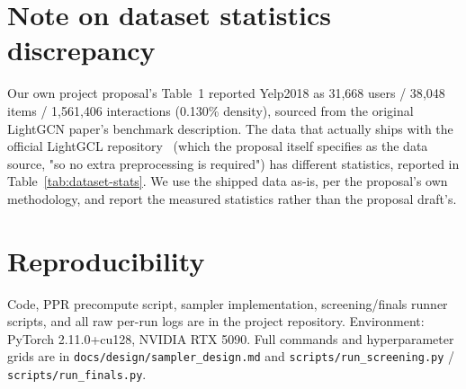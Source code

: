 \documentclass{article}
\begin{document}
\appendix
\section{Note on dataset statistics discrepancy}
\label{app:dataset-note}
Our own project proposal's Table~1 reported Yelp2018 as 31{,}668 users / 38{,}048 items /
1{,}561{,}406 interactions (0.130\% density), sourced from the original LightGCN paper's
benchmark description. The data that actually ships with the official LightGCL
repository~\cite{lightgcl} (which the proposal itself specifies as the data source, "so
no extra preprocessing is required") has different statistics, reported in
Table~\ref{tab:dataset-stats}. We use the shipped data as-is, per the proposal's own
methodology, and report the measured statistics rather than the proposal draft's.

\section{Reproducibility}
Code, PPR precompute script, sampler implementation, screening/finals runner scripts, and
all raw per-run logs are in the project repository. Environment: PyTorch 2.11.0+cu128,
NVIDIA RTX 5090. Full commands and hyperparameter grids are in
\texttt{docs/design/sampler\_design.md} and \texttt{scripts/run\_screening.py} /
\texttt{scripts/run\_finals.py}.
\end{document}

